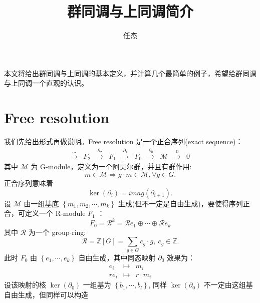 \documentclass[UTF8]{ctexart}
\begin{document}
\title{群同调与上同调简介}
\author{任杰}
\date{}

\maketitle
\noindent
本文将给出群同调与上同调的基本定义，并计算几个最简单的例子，希望给群同调与上同调一个直观的认识。

\section*{Free resolution}
\noindent
我们先给出形式再做说明。Free resolution 是一个正合序列(exact sequence)：
\begin{equation}
\begin{array}{cccccccccc}
\stackrel{\cdots}{\longrightarrow} & F_{2} & \stackrel{\partial_{2}}{\longrightarrow} & F_{1} & \stackrel{\partial_{1}}{\longrightarrow} & F_{0} & \stackrel{\partial_{0}}{\longrightarrow} & \mathcal{M} & \stackrel{0}{\longrightarrow} & 0\end{array}
\end{equation}
其中 $\mathcal{M}$ 为 G-module，定义为一个阿贝尔群，并且有群作用:
\begin{equation}
m\in\mathcal{M}\Rightarrow g\cdot m\in\mathcal{M},\forall g\in G.
\end{equation}
正合序列意味着
\begin{equation}
\ker\left(\partial_{i}\right)=imag\left(\partial_{i+1}\right).
\end{equation}
设 $\mathcal{M}$ 由一组基底 $\left\{ m_{1},m_{2},\cdots,m_{k}\right\} $
生成(但不一定是自由生成)，要使得序列正合，可定义一个 R-module $F_{1}$ ：
\begin{equation}
F_{0}=\mathcal{R}^{k}=\mathcal{R}e_{1}\oplus\cdots\oplus\mathcal{R}e_{k}
\end{equation}
其中 $\mathcal{R}$ 为一个 group-ring:
\begin{equation}
\mathcal{R}=\mathbb{Z}\left[G\right]=\sum_{g\in G}c_{g}\cdot g,\ c_{g}\in\mathbb{Z}.
\end{equation}
此时 $F_{0}$ 由 $\left\{ e_{1},\cdots,e_{k}\right\} $ 自由生成，其中同态映射 $\partial_{0}$
效果为：
\begin{eqnarray}
e_{i} & \mapsto & m_{i}\\
re_{i} & \mapsto & r\cdot m_{i}
\end{eqnarray}
设该映射的核 $\ker\left(\partial_{0}\right)$ 一组基为 $\left\{ b_{1},\cdots,b_{l}\right\} $,
同样 $\ker\left(\partial_{0}\right)$ 不一定由这组基自由生成，但同样可以构造
\end{document}
